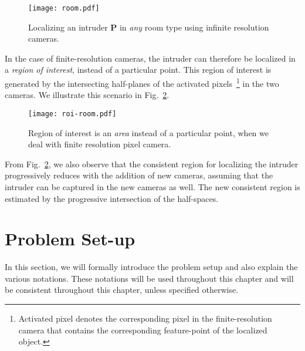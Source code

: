 \begin{figure}[htb]
\centering
{\texttt{[image: room.pdf]}}
\vspace{-1.5cm}
\caption{Localizing an intruder $\mathbf{P}$ in \emph{any} room type using infinite resolution cameras.}
\label{fig:room}
\end{figure}

In the case of finite-resolution cameras, the intruder can therefore be localized in a \emph{region of interest}, instead of a particular point. This region of interest is generated by the intersecting half-planes of the activated pixels~\footnote{Activated pixel denotes the corresponding pixel in the finite-resolution camera that contains the corresponding feature-point of the localized object.} in the two cameras. We illustrate this scenario in Fig.~\ref{fig:room2}. 

\begin{figure}[htb]
\centering
{\texttt{[image: roi-room.pdf]}}
\caption{Region of interest is an \emph{area} instead of a particular point, when we deal with finite resolution pixel camera.}
\label{fig:room2}
\end{figure}

From Fig.~\ref{fig:room2}, we also observe that the consistent region for localizing the intruder progressively reduces with the addition of new cameras, assuming that the intruder can be captured in the new cameras as well. The new consistent region is estimated by the progressive intersection of the half-spaces. 

\section{Problem Set-up}
\label{sec:chap8-setup}
In this section, we will formally introduce the problem setup and also explain the various notations. These notations will be used throughout this chapter and will be consistent throughout this chapter, unless specified otherwise. 

